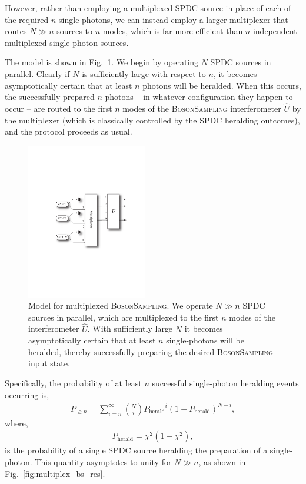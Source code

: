 However, rather than employing a multiplexed SPDC source in place of each of the required $n$ single-photons, we can instead employ a larger multiplexer that routes \mbox{$N\gg n$} sources to $n$ modes, which is far more efficient than $n$ independent multiplexed single-photon sources.

The model is shown in Fig.~\ref{fig:multiplexed_bs}. We begin by operating $N$ SPDC sources in parallel. Clearly if $N$ is sufficiently large with respect to $n$, it becomes asymptotically certain that at least $n$ photons will be heralded. When this occurs, the successfully prepared $n$ photons -- in whatever configuration they happen to occur -- are routed to the first $n$ modes of the \textsc{BosonSampling} interferometer $\hat{U}$ by the multiplexer (which is classically controlled by the SPDC heralding outcomes), and the protocol proceeds as usual.

\begin{figure}[htpb]
\includegraphics[width=0.47\textwidth]{multiplexed_boson_sampling}
\caption{Model for multiplexed \textsc{BosonSampling}. We operate \mbox{$N\gg n$} SPDC sources in parallel, which are multiplexed to the first $n$ modes of the interferometer $\hat{U}$. With sufficiently large $N$ it becomes asymptotically certain that at least $n$ single-photons will be heralded, thereby successfully preparing the desired \textsc{BosonSampling} input state.} \label{fig:multiplexed_bs}
\end{figure}

Specifically, the probability of at least $n$ successful single-photon heralding events occurring is,
\begin{align}
P_{\geq n} = \sum_{i=n}^\infty \binom{N}{i} 	{P_\mathrm{herald}}^i (1-P_\mathrm{herald})^{N-i},
\end{align}
where,
\begin{align}
	P_\mathrm{herald} = \chi^2(1-\chi^2),
\end{align}
is the probability of a single SPDC source heralding the preparation of a single-photon. This quantity asymptotes to unity for \mbox{$N\gg n$}, as shown in Fig.~\ref{fig:multiplex_bs_res}.

